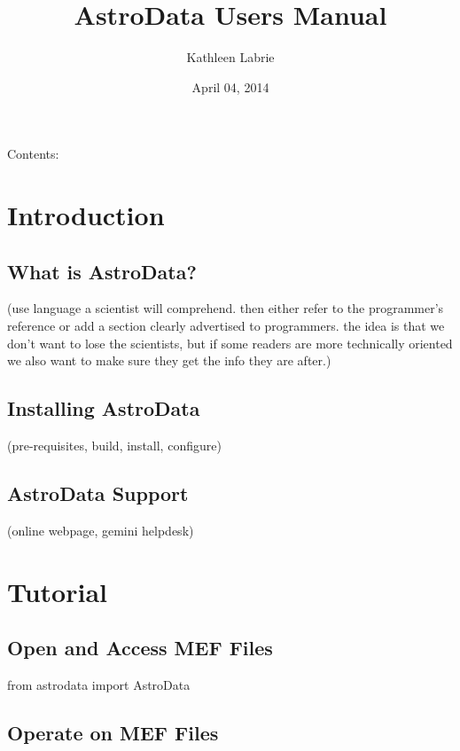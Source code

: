 \documentclass[letterpaper,10pt,english]{sphinxmanual}
\title{AstroData Users Manual}
\date{April 04, 2014}
\author{Kathleen Labrie}
\begin{document}
\maketitle
\tableofcontents
{}\label{index::doc}


Contents:


\chapter{Introduction}
\label{intro:introduction}\label{intro::doc}\label{intro:astrodata-user-s-manual}

\section{What is AstroData?}
\label{intro:what-is-astrodata}
(use language a scientist will comprehend.  then either refer to the programmer's reference
or add a section clearly advertised to programmers.  the idea is that we don't want to lose
the scientists, but if some readers are more technically oriented we also want to make sure
they get the info they are after.)


\section{Installing AstroData}
\label{intro:installing-astrodata}
(pre-requisites, build, install, configure)


\section{AstroData Support}
\label{intro:astrodata-support}
(online webpage, gemini helpdesk)


\chapter{Tutorial}
\label{tutorial::doc}\label{tutorial:tutorial}

\section{Open and Access MEF Files}
\label{tutorial:open-and-access-mef-files}
from astrodata import AstroData


\section{Operate on MEF Files}
\label{tutorial:operate-on-mef-files}
\end{document}
